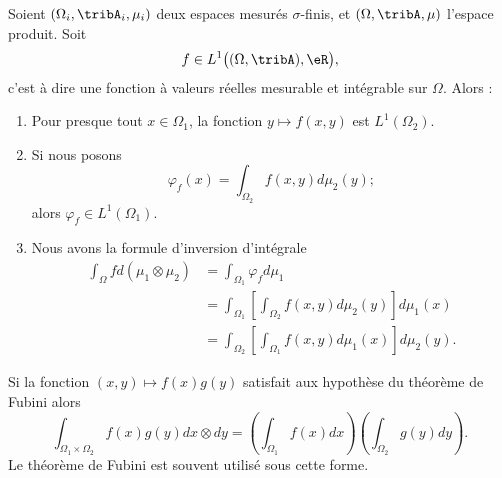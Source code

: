\begin{theorem}\label{ThoFubinioYLtPI}
    Soient \( (\Omega_i,\tribA_i,\mu_i)\) deux espaces mesurés \( \sigma\)-finis, et \( (\Omega,\tribA,\mu)\) l'espace produit. Soit 
    \begin{equation}
        f\in L^1\big( (\Omega,\tribA),\eR \big),
    \end{equation}
    c'est à dire une fonction à valeurs réelles mesurable et intégrable sur \( \Omega\). Alors :
    \begin{enumerate}
        \item
            Pour presque tout \( x\in \Omega_1\), la fonction \( y\mapsto f(x,y)\) est \( L^1(\Omega_2)\).
        \item
            Si nous posons
            \begin{equation}
                \varphi_f(x)=\int_{\Omega_2}f(x,y)d\mu_2(y);
            \end{equation}
            alors \( \varphi_f\in L^1(\Omega_1)\).
        \item   \label{ItemQMWiolgiii}
            Nous avons la formule d'inversion d'intégrale
            \begin{subequations}
                \begin{align}
                \int_{\Omega}fd(\mu_1\otimes \mu_2)&=\int_{\Omega_1}\varphi_fd\mu_1\\
                &=\int_{\Omega_1}\left[ \int_{\Omega_2}f(x,y)d\mu_2(y) \right]d\mu_1(x)\\
                &=\int_{\Omega_2}\left[ \int_{\Omega_1}f(x,y)d\mu_1(x) \right]d\mu_2(y).
                \end{align}
            \end{subequations}
    \end{enumerate}
\end{theorem}

Si la fonction \( (x,y)\mapsto f(x)g(y)\) satisfait aux hypothèse du théorème de Fubini alors
\begin{equation}    \label{EqTJEEsJW}
    \int_{\Omega_1\times \Omega_2} f(x)g(y)dx\otimes dy=\left( \int_{\Omega_1}f(x)dx \right)\left( \int_{\Omega_2}g(y)dy \right).
\end{equation}
Le théorème de Fubini est souvent utilisé sous cette forme.


